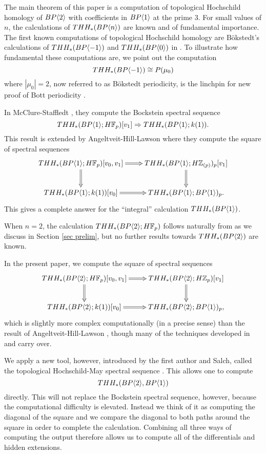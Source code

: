 The main theorem of this paper is a computation of topological Hochschild homology of $BP\langle 2 \rangle$ with coefficients in $BP\langle 1 \rangle$ at the prime $3$. %
For small values of $n$, the calculations of $THH_*(BP\langle n \rangle)$ are known and of fundamental importance. The first known computations of topological Hochschild homology are B\"okstedt's calculations of  $THH_*(BP\langle -1 \rangle)$ and $THH_*(BP\langle 0 \rangle)$ in \cite{Bok85}. To illustrate how fundamental these computations are, we point out the computation 
\[THH_*(BP\langle -1 \rangle) \cong P(\mu_0)\]
where $|\mu_0|=2$, now referred to as B\"okstedt periodicity, is the linchpin for new proof of Bott periodicity \cite{HN19}.

In McClure-Staffledt \cite{McClureStaffeldt}, they compute the Bockstein spectral sequence 
\[ THH_*(BP\langle 1 \rangle; H\mathbb{F}_p)[v_1]\Rightarrow THH_*(BP\langle 1 \rangle ; k(1) ).\]
This result is extended by Angeltveit-Hill-Lawson \cite{AHL} where they compute the square of spectral sequences 
\[ 
\xymatrix{
THH_*(\tBP{1}; H\mathbb{F}_p)[v_0,v_1] \ar@{=>}[r] \ar@{=>}[d] & THH_*(\tBP{1}; H\mathbb{Z}_{(p)})_p[v_1] \ar@{=>}[d] \\
THH_*(\tBP{1}; k(1))[v_0] \ar@{=>}[r] & THH_*(\tBP{1};\tBP{1})_p.
}
\]
This gives a complete answer for the ``integral'' calculation $THH_*(BP\langle 1 \rangle)$. 


When $n=2$, the calculation $THH_*(BP\langle 2 \rangle;H\mathbb{F}_p)$ follows naturally from \cite{AngeltveitRognes} as we discuss in Section \ref{sec prelim}, but no further results towards $THH_*(BP\langle 2 \rangle)$ are known.

In the present paper, we compute the square of spectral sequences
\[ 
\xymatrix{
THH_*(\tBP{2}; H\mathbb{F}_p)[v_0,v_1] \ar@{=>}[r] \ar@{=>}[d] & THH_*(\tBP{2}; H\mathbb{Z}_{p})[v_1] \ar@{=>}[d] \\
THH_*(\tBP{2}; k(1))[v_0] \ar@{=>}[r] & THH_*(\tBP{2};\tBP{1})_p,
}
\]
which is slightly more complex computationally (in a precise sense) than the result of Angeltveit-Hill-Lawson \cite{AHL}, though many of the techniques developed in \cite{AHL} and \cite{McClureStaffeldt} carry over.

We apply a new tool, however, introduced by the first author and Salch, called the topological Hochschild-May spectral sequence \cite{THH-May}. This allows one to compute 
\[THH_*(BP\langle 2 \rangle,BP\langle 1 \rangle)\]
directly. This will not replace the Bockstein spectral sequence, however, because the computational difficulty is elevated. Instead we think of it as computing the diagonal of the square and we compare the diagonal to both paths around the square in order to complete the calculation. Combining  all three ways of computing the output therefore allows us to compute all of the differentials and hidden extensions. 

